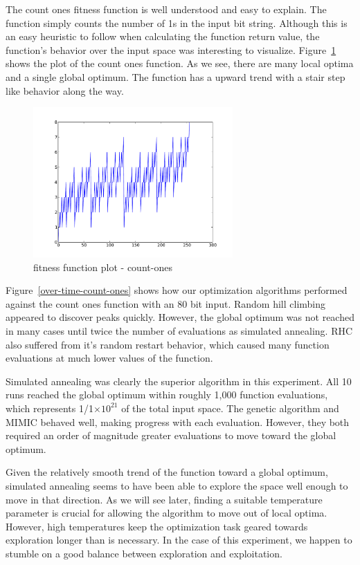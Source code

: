 \documentclass{sig-alternate}
\providecommand{\e}[1]{\ensuremath{\times 10^{#1}}}
\begin{document}
The count ones fitness function is well understood and easy to explain. The function simply counts the number of 1s in the input bit string. Although this is an easy heuristic to follow when calculating the function return value, the function's behavior over the input space was interesting to visualize. Figure~\ref{plot-count-ones} shows the plot of the count ones function. As we see, there are many local optima and a single global optimum. The function has a upward trend with a stair step like behavior along the way.

\begin{figure}[!htbp]
    \centering
    \includegraphics[width=3in]{part1.2/count-ones-plot.pdf}
    \caption{fitness function plot - count-ones\label{plot-count-ones}}
\end{figure} 

Figure~\ref{over-time-count-ones} shows how our optimization algorithms performed against the count ones function with an 80 bit input. Random hill climbing appeared to discover peaks quickly. However, the global optimum was not reached in many cases until twice the number of evaluations as simulated annealing. RHC also suffered from it's random restart behavior, which caused many function evaluations at much lower values of the function.

Simulated annealing was clearly the superior algorithm in this experiment. All 10 runs reached the global optimum within roughly 1,000 function evaluations, which represents 1/1\e{21} of the total input space. The genetic algorithm and MIMIC behaved well, making progress with each evaluation. However, they both required an order of magnitude greater evaluations to move toward the global optimum.

Given the relatively smooth trend of the function toward a global optimum, simulated annealing seems to have been able to explore the space well enough to move in that direction. As we will see later, finding a suitable temperature parameter is crucial for allowing the algorithm to move out of local optima. However, high temperatures keep the optimization task geared towards exploration longer than is necessary. In the case of this experiment, we happen to stumble on a good balance between exploration and exploitation.
\end{document}

